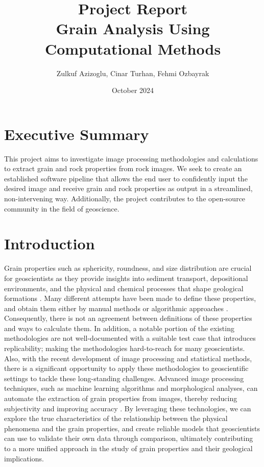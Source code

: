 \documentclass{article}
\title{\textbf{Project Report}\\ Grain Analysis Using Computational Methods}
\author{Zulkuf Azizoglu, Cinar Turhan, Fehmi Ozbayrak}
\date{October 2024}
\begin{document}
\maketitle

\section*{Executive Summary}
This project aims to investigate image processing methodologies and calculations to extract grain and rock properties from rock images. We seek to create an established software pipeline that allows the end user to confidently input the desired image and receive grain and rock properties as output in a streamlined, non-intervening way. Additionally, the project contributes to the open-source community in the field of geoscience.

\section{Introduction}
Grain properties such as sphericity, roundness, and size distribution are crucial for geoscientists as they provide insights into sediment transport, depositional environments, and the physical and chemical processes that shape geological formations \citep{blott2006}. Many different attempts have been made to define these properties, and obtain them either by manual methods or algorithmic approaches \citep{cox1927method, krumbein1941measurement, wadell1932volume, zheng2015traditional}. Consequently, there is not an agreement between definitions of these properties and ways to calculate them. In addition, a notable portion of the existing methodologies are not well-documented with a suitable test case that introduces replicability; making the methodologies hard-to-reach for many geoscientists. Also, with the recent development of image processing and statistical methods, there is a significant opportunity to apply these methodologies to geoscientific settings to tackle these long-standing challenges. Advanced image processing techniques, such as machine learning algorithms and morphological analyses, can automate the extraction of grain properties from images, thereby reducing subjectivity and improving accuracy \citep{karpatne2018machine, peregrina2013automatic, williams1998sand, arasan2011effect}. By leveraging these technologies, we can explore the true characteristics of the relationship between the physical phenomena and the grain properties, and create reliable models that geoscientists can use to validate their own data through comparison, ultimately contributing to a more unified approach in the study of grain properties and their geological implications.
\end{document}

